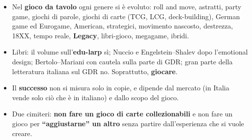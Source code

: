 \begin{itemize}
        \textbf{conflitto, azione, risoluzione, effetto}. Il master è un
        giocatore. Dalla nascita di D\&D (1974) dal wargame, attraverso gli
        adattamenti a nastro degli anni '80--'90, si arriva alla \textbf{New
        Wave} di The Forge (``il sistema conta''), ai \textbf{giochi
        focalizzati} (non semplificati), all'OSR, agli story game, ai giochi per
        due, in solitario e micro.
  \item Nel \textbf{gioco da tavolo} ogni genere si è evoluto: roll and move,
        astratti, party game, giochi di parole, giochi di carte (TCG, LCG,
        deck-building), German game ed Eurogame, American, strategici,
        movimento nascosto, destrezza, 18XX, tempo reale, \textbf{Legacy},
        libri-gioco, megagame, ibridi.
  \item Libri: il volume sull'\textbf{edu-larp} sì; Nuccio e Engelstein--Shalev
        dopo l'emotional design; Bertolo--Mariani con cautela sulla parte di GDR;
        gran parte della letteratura italiana sul GDR no. Soprattutto,
        \textbf{giocare}.
  \item Il \textbf{successo} non si misura solo in copie, e dipende dal mercato
        (in Italia vende solo ciò che è in italiano) e dallo scopo del gioco.
  \item Due cimiteri: \textbf{non fare un gioco di carte collezionabili} e non
        fare un gioco per \textbf{``aggiustarne'' un altro} senza partire
        dall'esperienza che si vuole creare.
\end{itemize}
